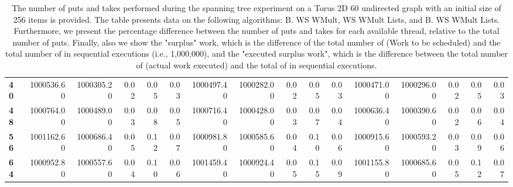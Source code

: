 \begin{table}[!ht]
{\begin{tabular}{lrrrrrrrrrrrrrrr}
\textbf{40} &  1000536.60 & 1000305.20 &           0.02 &        0.05 &                 0.03 &     1000497.40 & 1000282.00 &           0.02 &        0.05 &                 0.03 &        1000471.00 & 1000296.00 &           0.02 &        0.05 &                 0.03 \\
\textbf{48} &  1000764.00 & 1000489.00 &           0.03 &        0.08 &                 0.05 &     1000716.40 & 1000428.00 &           0.03 &        0.07 &                 0.04 &        1000636.40 & 1000390.60 &           0.02 &        0.06 &                 0.04 \\
\textbf{56} &  1001162.60 & 1000686.40 &           0.05 &        0.12 &                 0.07 &     1000981.80 & 1000585.60 &           0.04 &        0.10 &                 0.06 &        1000915.60 & 1000593.20 &           0.03 &        0.09 &                 0.06 \\
\textbf{64} &  1000952.80 & 1000557.60 &           0.04 &        0.10 &                 0.06 &     1001459.40 & 1000924.40 &           0.05 &        0.15 &                 0.09 &        1001155.80 & 1000685.60 &           0.05 &        0.12 &                 0.07 \\
\bottomrule
\end{tabular}}
\label{difference-Torus_2D_60_undirected-256-B_WS_NC_MULT_OPT-WS_NC_MULT_LA_OPT-B_WS_NC_MULT_LA_OPT}
\caption{The number of puts and takes performed during the
    spanning tree experiment on a Torus 2D 60 undirected graph with an initial size
    of 256 items is provided. The table presents data on the
    following algorithms: B. WS WMult, WS WMult Lists, and
    B. WS WMult Lists. Furthermore, we present the percentage difference
    between the number of puts and takes for each available thread,
    relative to the total number of puts. Finally, also we show the
    "surplus" work, which is the difference of the total number of
    \Puts (Work to be scheduled) and the total number of \Puts in
    sequential executions (i.e., 1,000,000), and the "executed surplus
    work", which is the difference between the total number of \Takes
    (actual work executed) and the total of \Takes in sequential
    executions.}
\end{table}
